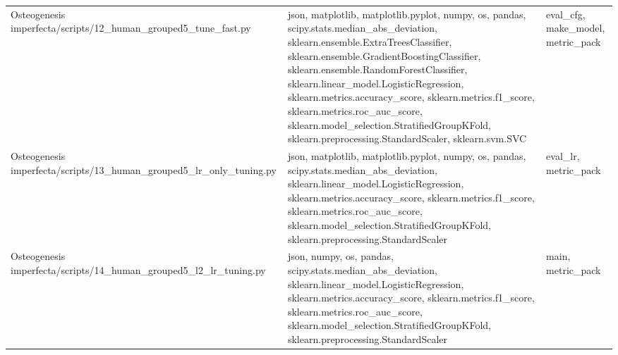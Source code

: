 \documentclass[11pt]{article}
\begin{document}
\begin{longtable}{p{}p{}p{}}
Osteogenesis imperfecta/scripts/12\_human\_grouped5\_tune\_fast.py & json, matplotlib, matplotlib.pyplot, numpy, os, pandas, scipy.stats.median\_abs\_deviation, sklearn.ensemble.ExtraTreesClassifier, sklearn.ensemble.GradientBoostingClassifier, sklearn.ensemble.RandomForestClassifier, sklearn.linear\_model.LogisticRegression, sklearn.metrics.accuracy\_score, sklearn.metrics.f1\_score, sklearn.metrics.roc\_auc\_score, sklearn.model\_selection.StratifiedGroupKFold, sklearn.preprocessing.StandardScaler, sklearn.svm.SVC & eval\_cfg, make\_model, metric\_pack \\
Osteogenesis imperfecta/scripts/13\_human\_grouped5\_lr\_only\_tuning.py & json, matplotlib, matplotlib.pyplot, numpy, os, pandas, scipy.stats.median\_abs\_deviation, sklearn.linear\_model.LogisticRegression, sklearn.metrics.accuracy\_score, sklearn.metrics.f1\_score, sklearn.metrics.roc\_auc\_score, sklearn.model\_selection.StratifiedGroupKFold, sklearn.preprocessing.StandardScaler & eval\_lr, metric\_pack \\
Osteogenesis imperfecta/scripts/14\_human\_grouped5\_l2\_lr\_tuning.py & json, numpy, os, pandas, scipy.stats.median\_abs\_deviation, sklearn.linear\_model.LogisticRegression, sklearn.metrics.accuracy\_score, sklearn.metrics.f1\_score, sklearn.metrics.roc\_auc\_score, sklearn.model\_selection.StratifiedGroupKFold, sklearn.preprocessing.StandardScaler & main, metric\_pack \\
\end{longtable}
\end{document}
